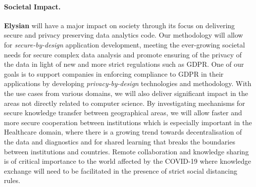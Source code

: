 \documentclass[a4paper,11pt]{article}
\newcommand{\project}[1]{\textbf{#1}\xspace}
\newcommand{\SECURITY}{\project{Elysian}}
\newcommand{\TheProject}{\SECURITY}
\begin{document}
\paragraph*{Societal Impact.}
\noindent
\TheProject{} will have a major impact on society through its focus on delivering secure and privacy preserving data analytics code. Our methodology will allow for \emph{secure-by-design} application development, meeting the ever-growing societal needs for secure complex data analysis and promote ensuring of the privacy of the data in light of new and more strict regulations such as GDPR. One of our goals is to support companies in enforcing compliance to GDPR in their applications by developing \emph{privacy-by-design} technologies and methodology. With the use cases from various domains, we will also deliver significant impact in the areas not directly related to computer science. By investigating mechanisms for secure knowledge transfer between geographical areas, we will allow faster and more secure cooperation between institutions which is especially important in the Healthcare domain, where there is a growing trend towards decentralisation of the data and diagnostics and for shared learning that breaks the boundaries between institutions and countries. Remote collaboration and knowledge sharing is of critical importance to the world affected by the COVID-19 where knowledge exchange will need to be facilitated in the presence of strict social distancing rules.
\end{document}
